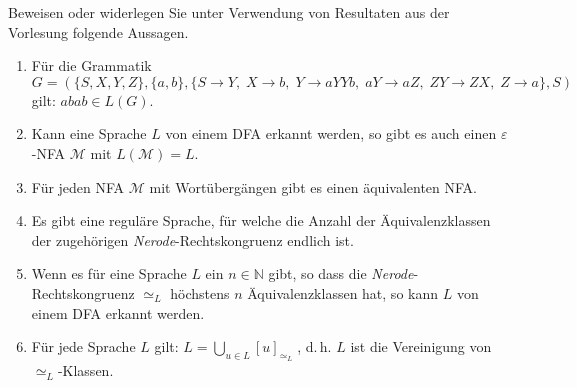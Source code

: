 
\begin{exercise}
Beweisen oder widerlegen Sie unter Verwendung von Resultaten aus der Vorlesung folgende Aussagen.
\begin{enumerate}
\item F\"ur die Grammatik $G=(\{S,X,Y,Z\},\{a,b\},\{S\rightarrow Y,\;X\rightarrow b,\;Y\rightarrow aYYb,\;aY\rightarrow aZ,\;ZY\rightarrow ZX,\;Z\rightarrow a\},S)$ gilt: $abab\in L(G)$.
\item Kann eine Sprache $L$ von einem DFA erkannt werden, so gibt es auch einen
  $\varepsilon$-NFA $\mathcal M$ mit $L({\mathcal M})=L$.
\item F\"ur jeden NFA $\mathcal M$ mit Wort\"uberg\"angen gibt es einen \"aquivalenten NFA.
\item Es gibt eine regul\"are Sprache, f\"ur welche die Anzahl der \"Aquivalenzklassen der zugeh\"origen {\emph{Nerode}}-Rechtskongruenz endlich ist.
\item Wenn es f\"ur eine Sprache $L$ ein $n\in \mathbb N$ gibt, so dass die {\emph{Nerode}}-Rechtskongruenz $\simeq_L$ höchstens $n$ Äquivalenzklassen hat, so
  kann $L$ von einem DFA erkannt werden.
\item F\"ur jede Sprache $L$ gilt: $L = \bigcup\limits_{u \in L} [u]_{\simeq_{L}}\;$, d.\,h. $L$ ist die Vereinigung von $\simeq_{L}$-Klassen.
\end{enumerate}
\end{exercise}

